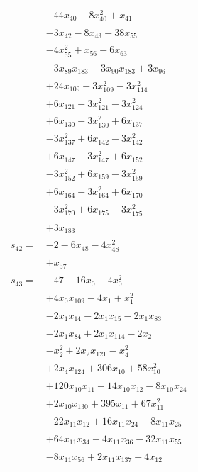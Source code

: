\begin{longtable}{@{}r@{\;}l@{}}
 & \(\displaystyle -44x_{40} -8x_{40}^{2} +x_{41}\) \\
 & \(\displaystyle -3x_{42} -8x_{43} -38x_{55}\) \\
 & \(\displaystyle -4x_{55}^{2} +x_{56} -6x_{63}\) \\
 & \(\displaystyle -3x_{89}x_{183} -3x_{90}x_{183} +3x_{96}\) \\
 & \(\displaystyle +24x_{109} -3x_{109}^{2} -3x_{114}^{2}\) \\
 & \(\displaystyle +6x_{121} -3x_{121}^{2} -3x_{124}^{2}\) \\
 & \(\displaystyle +6x_{130} -3x_{130}^{2} +6x_{137}\) \\
 & \(\displaystyle -3x_{137}^{2} +6x_{142} -3x_{142}^{2}\) \\
 & \(\displaystyle +6x_{147} -3x_{147}^{2} +6x_{152}\) \\
 & \(\displaystyle -3x_{152}^{2} +6x_{159} -3x_{159}^{2}\) \\
 & \(\displaystyle +6x_{164} -3x_{164}^{2} +6x_{170}\) \\
 & \(\displaystyle -3x_{170}^{2} +6x_{175} -3x_{175}^{2}\) \\
 & \(\displaystyle +3x_{183}\) \\[3pt]
\(s_{42}=\) & \(\displaystyle -2 -6x_{48} -4x_{48}^{2}\) \\
 & \(\displaystyle +x_{57}\) \\[3pt]
\(s_{43}=\) & \(\displaystyle -47 -16x_{0} -4x_{0}^{2}\) \\
 & \(\displaystyle +4x_{0}x_{109} -4x_{1} +x_{1}^{2}\) \\
 & \(\displaystyle -2x_{1}x_{14} -2x_{1}x_{15} -2x_{1}x_{83}\) \\
 & \(\displaystyle -2x_{1}x_{84} +2x_{1}x_{114} -2x_{2}\) \\
 & \(\displaystyle -x_{2}^{2} +2x_{2}x_{121} -x_{4}^{2}\) \\
 & \(\displaystyle +2x_{4}x_{124} +306x_{10} +58x_{10}^{2}\) \\
 & \(\displaystyle +120x_{10}x_{11} -14x_{10}x_{12} -8x_{10}x_{24}\) \\
 & \(\displaystyle +2x_{10}x_{130} +395x_{11} +67x_{11}^{2}\) \\
 & \(\displaystyle -22x_{11}x_{12} +16x_{11}x_{24} -8x_{11}x_{25}\) \\
 & \(\displaystyle +64x_{11}x_{34} -4x_{11}x_{36} -32x_{11}x_{55}\) \\
 & \(\displaystyle -8x_{11}x_{56} +2x_{11}x_{137} +4x_{12}\) \\

\end{longtable}
